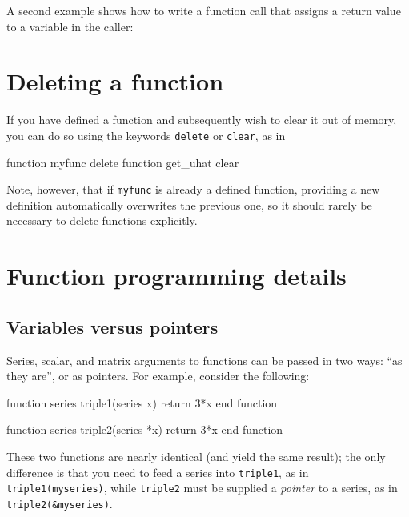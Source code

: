 A second example shows how to write a function call that assigns
a return value to a variable in the caller:
    

\section{Deleting a function}
\label{func-del}

If you have defined a function and subsequently wish to clear it out
of memory, you can do so using the keywords \texttt{delete} or
\texttt{clear}, as in

\begin{code}
function myfunc delete
function get_uhat clear
\end{code}

Note, however, that if \texttt{myfunc} is already a defined function,
providing a new definition automatically overwrites the previous one,
so it should rarely be necessary to delete functions explicitly.

\section{Function programming details}
\label{func-details}

\subsection{Variables versus pointers}
\label{funscope}

Series, scalar, and matrix arguments to functions can be passed in two
ways: ``as they are'', or as pointers. For example, consider the
following:
\begin{code}
function series triple1(series x)
  return 3*x
end function
  
function series triple2(series *x)
  return 3*x
end function
\end{code}

These two functions are nearly identical (and yield the same result);
the only difference is that you need to feed a series into
\texttt{triple1}, as in \texttt{triple1(myseries)}, while
\texttt{triple2} must be supplied a \emph{pointer} to a series, as in
\texttt{triple2(\&myseries)}. 

